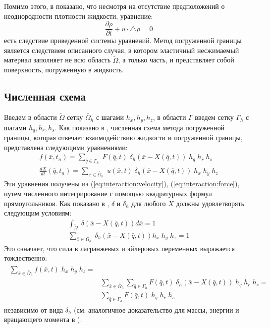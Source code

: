 Помимо этого, в \cite{peskin2002immersed} показано, что несмотря на отсутствие предположений
о неоднородности плотности жидкости, уравнение:
\begin{equation}
    \frac{\partial \rho}{\partial t} + u \cdot \triangle \rho = 0
\end{equation}
есть следствие приведенной системы уравнений. Метод погруженной границы является следствием описанного случая,
в котором эластичный несжимаемый материал заполняет не всю область $\tilde{\Omega}$, а только часть, и представляет
собой поверхность, погруженную в жидкость.

\subsection*{Численная схема}

Введем в области $\tilde{\Omega}$ сетку $\tilde{\Omega_h}$ с шагами $h_x, h_y, h_z$, в области $\Gamma$ введем сетку $\Gamma_h$
с шагами $h_q, h_r, h_s$. Как показано в \cite{peskin2002immersed}, численная схема метода погруженной границы,
которая отвечает взаимодействию жидкости и погруженной границы, представлена следующими уравнениями:
\begin{gather}
    f(\bar{x}, t_n) = \sum_{\bar{q} \in \Gamma_h}\; F(\bar{q}, t) \; \delta_h (\bar{x} - X(\bar{q}, t)) \; h_q\; h_r\;  h_s\\
    \frac{dX}{dt}(\bar{q}, t_n) = \sum_{\bar{x} \in \tilde{\Omega_h}}\; u(\bar{x}, t) \; \delta_h (\bar{x} - X(\bar{q}, t)) \; h_x\; h_y\;  h_z
\end{gather}
Эти уравнения получены из (\ref{eq:interaction:velocity}), (\ref{eq:interaction:force}),
путем численного интегрирование с помощью квадратурных формул прямоугольников.
Как показано в \cite{peskin2002immersed}, $\delta$ и $\delta_h$ для любого $X$ должны удовлетворять следующим условиям:
\begin{gather}
    \int_{\tilde{\Omega}} \; \delta(\bar{x} - X(\bar{q}, t)) d\bar{x} = 1\\
    \sum_{\bar{x} \in \tilde{\Omega_h}} \; \delta_h (\bar{x} - X(\bar{q}, t)) h_x\; h_y\; h_z = 1
\end{gather}
Это означает, что сила в лагранжевых и эйлеровых переменных выражается тождественно:
\begin{align}
\begin{split}
    \sum_{\bar{x} \in \tilde{\Omega_h}} f(\bar{x}, t)\; h_x\; h_y\; h_z =\\
    & \sum_{\bar{x} \in \tilde{\Omega_h}} \sum_{\bar{q} \in \Gamma_h} F(\bar{q}, t)\; \delta_h (\bar{x} - X(\bar{q}, t))\; h_q\; h_r\; h_s = \\
    & \sum_{\bar{q} \in \Gamma_h} F(\bar{q}, t)\; h_q\; h_r\; h_s
\end{split}
\end{align}
независимо от вида $\delta_h$ (см. аналогичное доказательство для массы, энергии и вращающего момента в \cite{peskin2002immersed}).

